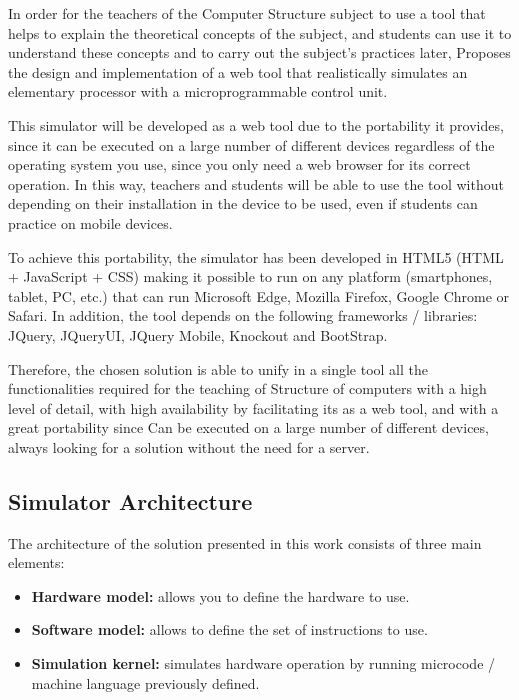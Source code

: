 In order for the teachers of the Computer Structure subject to use a tool that helps to explain the theoretical concepts of the subject, and students can use it to understand these concepts and to carry out the subject's practices later, Proposes the design and implementation of a web tool that realistically simulates an elementary processor with a microprogrammable control unit.

This simulator will be developed as a web tool due to the portability it provides, since it can be executed on a large number of different devices regardless of the operating system you use, since you only need a web browser for its correct operation. In this way, teachers and students will be able to use the tool without depending on their installation in the device to be used, even if students can practice on mobile devices.

To achieve this portability, the simulator has been developed in HTML5 (HTML + JavaScript + CSS) making it possible to run on any platform (smartphones, tablet, PC, etc.) that can run Microsoft Edge, Mozilla Firefox, Google Chrome or Safari. In addition, the tool depends on the following frameworks / libraries: JQuery, JQueryUI, JQuery Mobile, Knockout and BootStrap.

Therefore, the chosen solution is able to unify in a single tool all the functionalities required for the teaching of Structure of computers with a high level of detail, with high availability by facilitating its as a web tool, and with a great portability since Can be executed on a large number of different devices, always looking for a solution without the need for a server.

\subsection{Simulator Architecture}

The architecture of the solution presented in this work consists of three main elements:

\begin{itemize}
\item \textbf{Hardware model:} allows you to define the hardware to use.
\item \textbf{Software model:} allows to define the set of instructions to use.
\item \textbf{Simulation kernel:} simulates hardware operation by running microcode / machine language previously defined.
\end{itemize}

